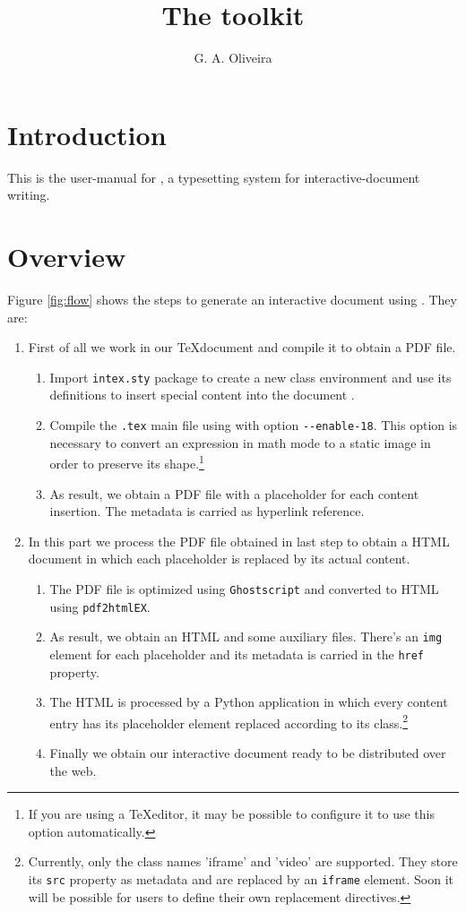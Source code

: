 \documentclass[10pt,a4paper]{article}
\author{G. A. Oliveira}
\title{The \intex\space toolkit}
\begin{document}
\maketitle
\section{Introduction}
This is the user-manual for \intex, a typesetting system for interactive-document writing.
\section{Overview}
Figure \ref{fig:flow} shows the steps to generate an interactive document using \intex. They are:
\begin{enumerate}[label*=\arabic*.]
	\item First of all we work in our \TeX\space document and compile it to obtain a PDF file.
	\begin{enumerate}[label*=\arabic*.]
		\item Import \verb|intex.sty| package to create a new class environment and use its definitions to insert special content into the document .
		\item Compile the \verb|.tex| main file using  with option \verb|--enable-18|. This option is necessary to convert an expression in math mode to a static image in order to preserve its shape.\footnote{If you are using a \TeX\space editor, it may be possible to configure it to use this option automatically.}
		\item As result, we obtain a PDF file with a placeholder for each content insertion. The metadata is carried as hyperlink reference.
	\end{enumerate}
	\item In this part we process the PDF file obtained in last step to obtain a HTML document in which each placeholder is replaced by its actual content.
	\begin{enumerate}[label*=\arabic*.]
		\item The PDF file is optimized using \verb|Ghostscript| and converted to HTML using \verb|pdf2htmlEX|.
		\item As result, we obtain an HTML and some auxiliary files. There's an \verb|img| element for each placeholder and its metadata is carried in the \verb|href| property.
		\item The HTML is processed by a Python application in which every content entry has its placeholder element replaced according to its class.\footnote{Currently, only the class names 'iframe' and 'video' are supported. They store its \verb|src| property as metadata and are replaced by an \verb|iframe| element. Soon it will be possible for users to define their own replacement directives.}
		\item Finally we obtain our interactive document ready to be distributed over the web.
	\end{enumerate}
\end{enumerate}
\end{document}
